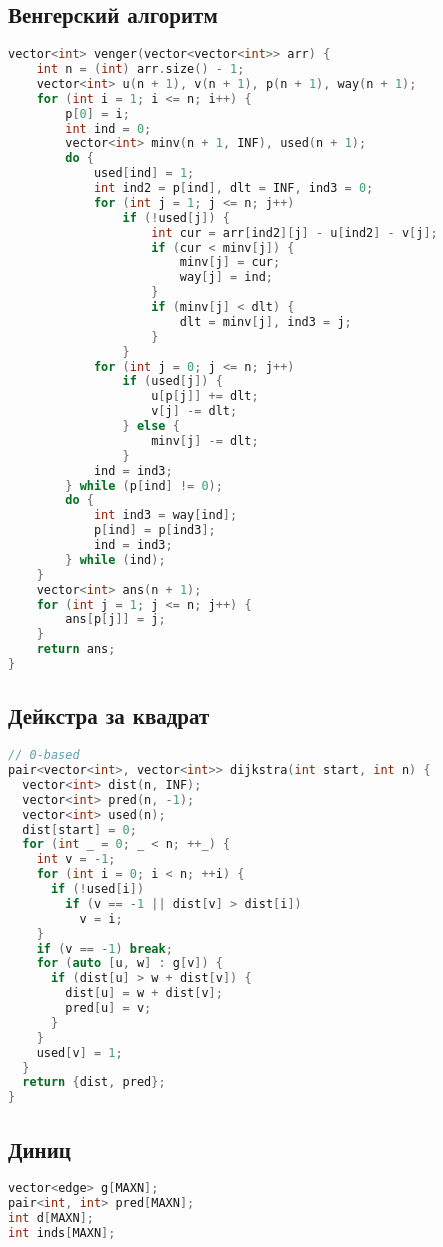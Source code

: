 \documentclass[10pt,a4paper,landscape,twosided]{extarticle}
\begin{document}
\begin{multicols*}{3}
\subsection{Венгерский алгоритм}
\begin{lstlisting}[language=C++]
vector<int> venger(vector<vector<int>> arr) {
    int n = (int) arr.size() - 1;
    vector<int> u(n + 1), v(n + 1), p(n + 1), way(n + 1);
    for (int i = 1; i <= n; i++) {
        p[0] = i;
        int ind = 0;
        vector<int> minv(n + 1, INF), used(n + 1);
        do {
            used[ind] = 1;
            int ind2 = p[ind], dlt = INF, ind3 = 0;
            for (int j = 1; j <= n; j++)
                if (!used[j]) {
                    int cur = arr[ind2][j] - u[ind2] - v[j];
                    if (cur < minv[j]) {
                        minv[j] = cur;
                        way[j] = ind;
                    }
                    if (minv[j] < dlt) {
                        dlt = minv[j], ind3 = j;
                    }
                }
            for (int j = 0; j <= n; j++)
                if (used[j]) {
                    u[p[j]] += dlt;
                    v[j] -= dlt;
                } else {
                    minv[j] -= dlt;
                }
            ind = ind3;
        } while (p[ind] != 0);
        do {
            int ind3 = way[ind];
            p[ind] = p[ind3];
            ind = ind3;
        } while (ind);
    }
    vector<int> ans(n + 1);
    for (int j = 1; j <= n; j++) {
        ans[p[j]] = j;
    }
    return ans;
}

\end{lstlisting}

\subsection{Дейкстра за квадрат}
\begin{lstlisting}[language=C++]
// 0-based
pair<vector<int>, vector<int>> dijkstra(int start, int n) {
  vector<int> dist(n, INF);
  vector<int> pred(n, -1);
  vector<int> used(n);
  dist[start] = 0;
  for (int _ = 0; _ < n; ++_) {
    int v = -1;
    for (int i = 0; i < n; ++i) {
      if (!used[i])
        if (v == -1 || dist[v] > dist[i])
          v = i;
    }
    if (v == -1) break;
    for (auto [u, w] : g[v]) {
      if (dist[u] > w + dist[v]) {
        dist[u] = w + dist[v];
        pred[u] = v;
      }
    }
    used[v] = 1;
  }
  return {dist, pred};
}
\end{lstlisting}

\subsection{Диниц}
\begin{lstlisting}[language=C++]
vector<edge> g[MAXN];
pair<int, int> pred[MAXN];
int d[MAXN];
int inds[MAXN];


\end{lstlisting}
\end{multicols*}
\end{document}
